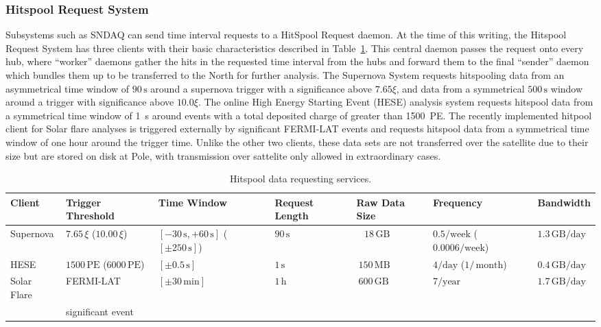 \subsubsection{\label{sect:hitspool}Hitspool Request System}

Subsystems such as SNDAQ can send time interval requests to a HitSpool
Request daemon. At the time of this writing, the Hitspool Request
System has three clients with their basic characteristics described in
Table~\ref{tab:hsclients}. This central daemon passes the request onto
every hub, where ``worker'' daemons gather the hits in the requested
time interval from the hubs and forward them to the final ``sender''
daemon which bundles them up to be transferred to the North for
further analysis. The Supernova System requests hitspooling data from an asymmetrical
time window of $90 \,\mathrm{s}$ around a
supernova trigger with a significance above $7.65 \xi$, and
data from a symmetrical
$500\,\mathrm{s}$ window around a trigger with significance above $10.0 \xi$.
The online High Energy Starting Event
(HESE) analysis system requests hitspool data from a
symmetrical time window of 1~s around events with a total deposited
charge of greater than 1500~PE.
The recently implemented hitpool client for Solar flare analyses is
triggered externally by significant FERMI-LAT events and requests
hitspool data from a
symmetrical time window of one hour around the trigger
time. Unlike the other two clients, these data sets
are not transferred over the satellite due to their size but are stored on
disk at Pole, with transmission over sattelite only allowed in
extraordinary cases.


\begin{table}
  \caption{Hitspool data requesting services.} 
    \centering
  \footnotesize
\begin{tabularx}{\textwidth}{XXXXXXX}
  \toprule
  Client &  Trigger Threshold & Time Window & Request Length & Raw Data Size & Frequency & Bandwidth \\
  \midrule
  Supernova & $7.65 \,\xi$ ($10.00 \,\xi$) & $[-30\,\mathrm{s},+60\,\mathrm{s}]$  ($[\pm250 \,\mathrm{s}]$)& $90 \,\mathrm{s}$& ~ $18 \,\mathrm{GB}$& $0.5/\mathrm{week}$ ($0.0006 / \mathrm{week}$)& $1.3 \,\mathrm{GB} / \mathrm{day}$\\
  HESE & $1500 \,\mathrm{PE} $  ($6000 \,\mathrm{PE} $) & $[\pm0.5\,\mathrm{s}]$& $1\,\mathrm{s}$  &  $~150\,\mathrm{MB}$ &  $4/\mathrm{day}$ ($1/\,\mathrm{month}$) & $0.4\,\mathrm{GB}/\mathrm{day}$  \\
  Solar Flare & FERMI-LAT & $[\pm30\,\mathrm{min}]$ & $1\,\mathrm{h}$&
  $~600\,\mathrm{GB}$& $ 7 / \mathrm{year}$& $ 1.7
  \,\mathrm{GB}/\mathrm{day}$\\
& significant event & & & & & \\
\bottomrule
\end{tabularx}
\label{tab:hsclients}
\end{table}


